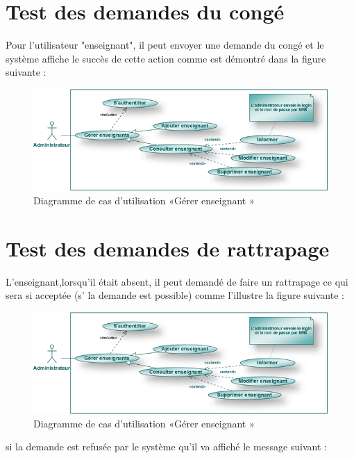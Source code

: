 \documentclass[12 pt ]{report}
\begin{document}
\section{Test des demandes du congé}
Pour l'utilisateur "enseignant", il peut envoyer une demande du congé et le système affiche le succès de cette action comme est démontré dans la figure suivante :
\begin{figure}[h]
 \begin{center}
 \includegraphics[width= 13 cm ,height= 6 cm]{admin2.png}
\caption{ Diagramme de cas d'utilisation  «Gérer enseignant »}
 \end{center}
\end{figure}
\section{Test des demandes de rattrapage}
L'enseignant,lorsqu'il était absent, il peut demandé de faire un rattrapage ce qui sera si acceptée (s' la demande est possible) comme l'illustre la figure suivante :

\begin{figure}[h]
 \begin{center}
 \includegraphics[width= 13 cm ,height= 6 cm]{admin2.png}
\caption{ Diagramme de cas d'utilisation  «Gérer enseignant »}
 \end{center}
\end{figure}
si la demande est refusée par le système qu'il va affiché le message suivant :
\end{document}
